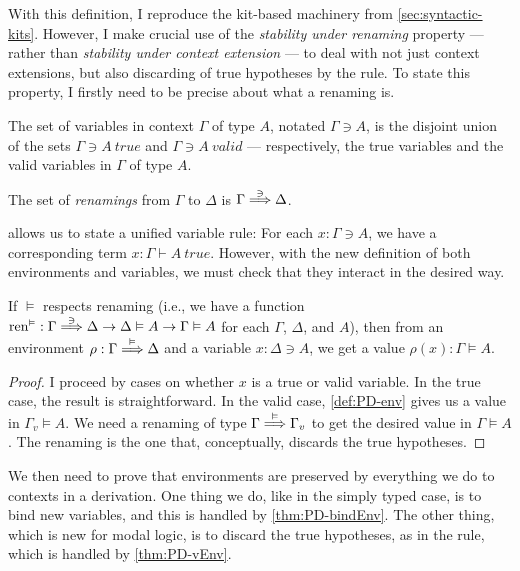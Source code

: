With this definition, I reproduce the kit-based machinery from
\cref{sec:syntactic-kits}.
However, I make crucial use of the \emph{stability under renaming} property ---
rather than \emph{stability under context extension} --- to deal with not just
context extensions, but also discarding of true hypotheses by the
 rule.
To state this property, I firstly need to be precise about what a renaming is.

\begin{definition}\label{def:PD-var}
  The set of variables in context $\Gamma$ of type $A$, notated $\Gamma \ni A$,
  is the disjoint union of the sets $\Gamma \ni A~\mathit{true}$ and
  $\Gamma \ni A~\mathit{valid}$ --- respectively, the true variables and the
  valid variables in $\Gamma$ of type $A$.

  The set of \emph{renamings} from $\Gamma$ to $\Delta$ is
  $\Gamma \stackrel{\ni}\Longrightarrow \Delta$.
\end{definition}

 allows us to state a unified variable rule: For each
$x : \Gamma \ni A$, we have a corresponding term
$x : \Gamma \vdash A~\mathit{true}$.
However, with the new definition of both environments and variables, we must
check that they interact in the desired way.

\begin{lemma}[lookup]\label{thm:PD-lookup}
  If $\vDash$ respects renaming (i.e., we have a function
  $\mathrm{ren}^\vDash :
  \Gamma \stackrel{\ni}\Longrightarrow \Delta \to \Delta \vDash A \to \Gamma \vDash A$
  for each $\Gamma$, $\Delta$, and $A$), then
  from an environment $\rho : \Gamma \stackrel{\vDash}\Longrightarrow \Delta$ and a variable
  $x : \Delta \ni A$, we get a value $\rho(x) : \Gamma \vDash A$.
\end{lemma}
\begin{proof}
  I proceed by cases on whether $x$ is a true or valid variable.
  In the true case, the result is straightforward.
  In the valid case, \cref{def:PD-env} gives us a value in $\Gamma_v \vDash A$.
  We need a renaming of type $\Gamma \stackrel{\vDash}\Longrightarrow \Gamma_v$ to get the desired
  value in $\Gamma \vDash A$.
  The renaming is the one that, conceptually, discards the true hypotheses.
\end{proof}

We then need to prove that environments are preserved by everything we do to
contexts in a derivation.
One thing we do, like in the simply typed case, is to bind new variables, and
this is handled by \cref{thm:PD-bindEnv}.
The other thing, which is new for modal logic, is to discard the true
hypotheses, as in the  rule, which is handled by
\cref{thm:PD-vEnv}.

